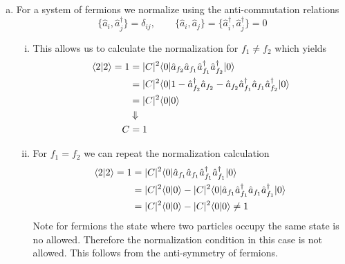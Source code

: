 \documentclass[11pt]{article}
\numberwithin{equation}{section}
\begin{document}
\begin{enumerate}[(a)]
\begin{enumerate}[(i)]
\end{enumerate}

\item For a system of fermions we normalize using the anti-commutation relations
$$\{\hat{a}_{i},\hat{a}^{\dagger}_{j}\} = \delta_{ij},\qquad\{\hat{a}_{i},\hat{a}_{j}\} = \{\hat{a}^{\dagger}_{i},\hat{a}^{\dagger}_{j}\} = 0$$

\begin{enumerate}[(i)]
\item This allows us to calculate the normalization for $f_1\ne{f_2}$ which yields
\begin{align*}
\langle{2}|{2}\rangle = 1 &= |C|^2\langle{0}|\hat{a}_{f_2}\hat{a}_{f_1}\hat{a}^{\dagger}_{f_1}\hat{a}^{\dagger}_{f_2}|{0}\rangle\\
&= |C|^2\langle{0}|1 - \hat{a}_{f_2}^{\dagger}\hat{a}_{f_2} - \hat{a}_{f_2}\hat{a}^{\dagger}_{f_1}\hat{a}_{f_1}\hat{a}^{\dagger}_{f_2}|{0}\rangle\\
&= |C|^2\langle{0}|{0}\rangle\\
&\Downarrow\\
C &= 1
\end{align*}

\item For $f_1=f_2$ we can repeat the normalization calculation
\begin{align*}
\langle{2}|{2}\rangle = 1 &= |C|^2\langle{0}|\hat{a}_{f_1}\hat{a}_{f_1}\hat{a}^{\dagger}_{f_1}\hat{a}^{\dagger}_{f_1}|{0}\rangle\\
&= |C|^2\langle{0}|{0}\rangle - |C|^2\langle{0}|\hat{a}_{f_1}\hat{a}^{\dagger}_{f_1}\hat{a}_{f_1}\hat{a}^{\dagger}_{f_1}|{0}\rangle\\
&= |C|^2\langle{0}|{0}\rangle - |C|^2\langle{0}|{0}\rangle \ne 1
\end{align*}
Note for fermions the state where two particles occupy the same state is no allowed. Therefore
the normalization condition in this case is not allowed. This follows from the anti-symmetry 
of fermions.
\end{enumerate}
\end{enumerate}
\end{document}

